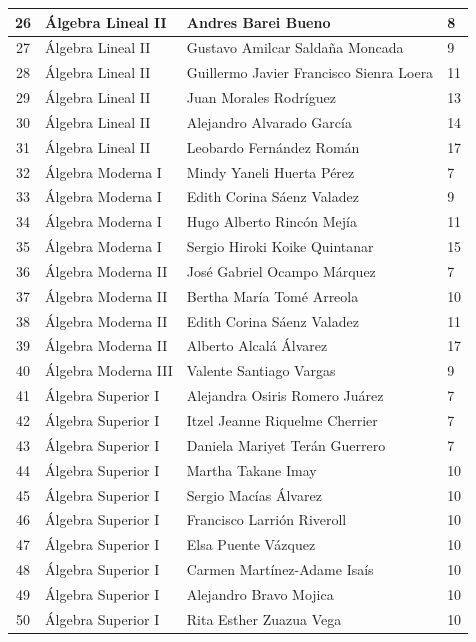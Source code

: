 {\begin{longtable}{|c|p{6.5cm}|p{5cm}|p{1.5cm}|}
26 & Álgebra Lineal II & Andres Barei Bueno & 8 \\ \hline
27 & Álgebra Lineal II & Gustavo Amilcar Saldaña Moncada & 9 \\ \hline
28 & Álgebra Lineal II & Guillermo Javier Francisco Sienra Loera & 11 \\ \hline
29 & Álgebra Lineal II & Juan Morales Rodríguez & 13 \\ \hline
30 & Álgebra Lineal II & Alejandro Alvarado García & 14 \\ \hline
31 & Álgebra Lineal II & Leobardo Fernández Román & 17 \\ \hline
32 & Álgebra Moderna I & Mindy Yaneli Huerta Pérez & 7 \\ \hline
33 & Álgebra Moderna I & Edith Corina Sáenz Valadez & 9 \\ \hline
34 & Álgebra Moderna I & Hugo Alberto Rincón Mejía & 11 \\ \hline
35 & Álgebra Moderna I & Sergio Hiroki Koike Quintanar & 15 \\ \hline
36 & Álgebra Moderna II & José Gabriel Ocampo Márquez & 7 \\ \hline
37 & Álgebra Moderna II & Bertha María Tomé Arreola & 10 \\ \hline
38 & Álgebra Moderna II & Edith Corina Sáenz Valadez & 11 \\ \hline
39 & Álgebra Moderna II & Alberto Alcalá Álvarez & 17 \\ \hline
40 & Álgebra Moderna III & Valente Santiago Vargas & 9 \\ \hline
41 & Álgebra Superior I & Alejandra Osiris Romero Juárez & 7 \\ \hline
42 & Álgebra Superior I & Itzel Jeanne Riquelme Cherrier & 7 \\ \hline
43 & Álgebra Superior I & Daniela Mariyet Terán Guerrero & 7 \\ \hline
44 & Álgebra Superior I & Martha Takane Imay & 10 \\ \hline
45 & Álgebra Superior I & Sergio Macías Álvarez & 10 \\ \hline
46 & Álgebra Superior I & Francisco Larrión Riveroll & 10 \\ \hline
47 & Álgebra Superior I & Elsa Puente Vázquez & 10 \\ \hline
48 & Álgebra Superior I & Carmen Martínez-Adame Isaís & 10 \\ \hline
49 & Álgebra Superior I & Alejandro Bravo Mojica & 10 \\ \hline
50 & Álgebra Superior I & Rita Esther Zuazua Vega & 10 \\ \hline

\end{longtable}}
